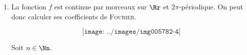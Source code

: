 {{\begin{enumerate}
\begin{center}
\end{center}

La fonction $f$ est $2\pi$-périodique, continue par morceaux sur $\Rr$. L'égalité de \textsc{Parseval} s'écrit $\frac{(a_0(f))^2}{2}+\sum_{n=1}^{+\infty}((a_n(f))^2+(b_n(f))^2)=\frac{1}{\pi}\int_{-\pi}^{\pi}(f(x))^2\;dx$ avec

\begin{center}
$\frac{1}{\pi}\int_{-\pi}^{\pi}(f(x))^2\;dx=\frac{1}{\pi}\int_{-\pi}^{\pi}\ch^2(\lambda x)\;dx=\frac{1}{\pi}\int_{-\pi}^{\pi}\frac{\ch(2\lambda x)+1}{2}\;dx=1+\frac{\sh(2\lambda\pi)}{2\pi}$,
\end{center}

et donc $1+\frac{\sh(2\lambda\pi)}{2\pi}=\frac{2\sh^2(\lambda\pi)}{\pi^2\lambda^2}+\frac{4\lambda^2\sh^2(\lambda\pi)}{\pi^2}\sum_{n=1}^{+\infty}\frac{1}{(\lambda^2+n^2)^2}$ puis

\begin{center}
$\sum_{n=1}^{+\infty}\frac{1}{(\lambda^2+n^2)^2}=\frac{\pi^2}{4\lambda^2\sh^2(\lambda\pi)}\left(1+\frac{\sh(2\lambda\pi)}{2\pi}-\frac{2\sh^2(\lambda\pi)}{\pi^2\lambda^2}\right)=\frac{2\pi^2\lambda^2+\pi\lambda\sh(2\lambda\pi)-4\lambda^2\sh^2(\lambda\pi)}{8\lambda^4\sh^2(\lambda\pi)}$.
\end{center}

\begin{center}
\end{center}

\item  La fonction $f$ est continue par morceaux sur $\Rr$ et $2\pi$-périodique. On peut donc calculer ses coefficients de \textsc{Fourier}.

$$\texttt{[image: ../images/img005782-4]}$$


Soit $n\in\Nn$.


\end{enumerate}}}

